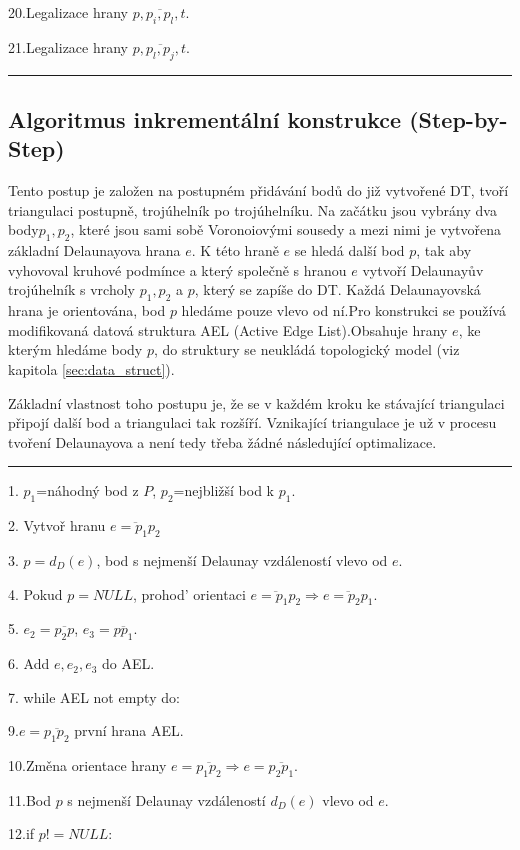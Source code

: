 \documentclass[12pt,a4paper]{article}
\begin{document}
20.\indent \indent Legalizace hrany $p,\overline{p_i,p_l},t$.

21.\indent \indent Legalizace hrany $p,\overline{p_l,p_j},t$.
\newline
\hrule

\newpage
\subsection{Algoritmus inkrementální konstrukce (Step-by-Step)}

Tento postup je založen na postupném přidávání bodů do již vytvořené DT, tvoří triangulaci postupně, trojúhelník po trojúhelníku. Na začátku jsou vybrány dva body$p_1, p_2$, které jsou sami sobě Voronoiovými sousedy a mezi nimi je vytvořena základní Delaunayova hrana $e$. K této hraně $e$ se hledá další bod 	$p$, tak aby vyhovoval kruhové podmínce a který společně s hranou $e$ vytvoří Delaunayův trojúhelník s vrcholy $p_1, p_2$ a $p$, který se zapíše do DT. Každá Delaunayovská hrana je orientována, bod $p$ hledáme pouze vlevo od ní.Pro konstrukci se používá modifikovaná datová struktura AEL (Active Edge List).Obsahuje hrany $e$, ke kterým hledáme body $p$, do struktury se neukládá topologický model (viz kapitola \ref{sec:data_struct}).

Základní vlastnost toho postupu je, že se v každém kroku ke stávající triangulaci připojí další bod a triangulaci tak rozšíří. Vznikající triangulace je už v procesu tvoření Delaunayova a není tedy třeba žádné následující optimalizace.

\bigskip
\hrule
1. $p_1$=náhodný bod z $P$, $p_2$=nejbližší bod k $p_1$.

2. Vytvoř hranu $\overline{e=p_1p_2}$

3. $p=d_D(e)$, bod s nejmenší Delaunay vzdáleností vlevo od $e$.

4. Pokud $p=NULL$, prohod’ orientaci $\overline{e=p_1p_2} \Rightarrow \overline{e=p_2p_1}$.

5. $e_2=\overline{p_2p}$, $e_3=\overline{pp_1}$.

6. Add $e, e_2, e_3$ do AEL.

7. while AEL not empty do:

9.\indent  $e=\overline{p_1p_2}$ první hrana AEL.

10.\indent  Změna orientace hrany $e=\overline{p_1p_2} \Rightarrow e=\overline{p_2p_1}$.

11.\indent  Bod $p$ s nejmenší Delaunay vzdáleností $d_D(e)$ vlevo od $e$.

12.\indent  if $p! =NULL:$
\end{document}
